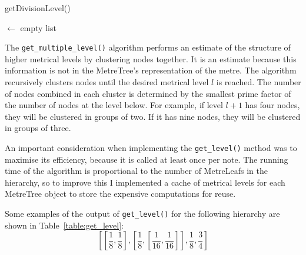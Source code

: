 \documentclass[12pt,twoside,openright]{report}
\begin{document}
\begin{algorithm}[H]

    \caption{getDivisionLevel()}
    \BlankLine

    \NewSequence $\gets$ empty list\;
    \label{alg:getDivisionLevel}
\end{algorithm}

The \verb'get_multiple_level()' algorithm performs an estimate of the structure of
higher metrical levels by clustering nodes together. It is an estimate because this information is not in the
MetreTree's representation of the metre. The algorithm recursively clusters nodes until
the desired metrical level $l$ is reached. The number of nodes combined in each cluster is
determined by the smallest prime factor of the number of nodes at the level below. For
example, if level $l+1$ has four nodes, they will be clustered in groups of two. If it
has nine nodes, they will be clustered in groups of three.

An important consideration when implementing the \verb'get_level()' method was to
maximise its efficiency, because it is called at least once per note. The
running time of the algorithm is proportional to the number of MetreLeafs in the
hierarchy, so to improve this I implemented a cache of metrical levels for each
MetreTree object to store the expensive computations for reuse.

Some examples of the output of \verb'get_level()' for the following hierarchy are shown in Table~\ref{table:get_level}:
\[
    \left[
        \left[\frac{1}{8},\frac{1}{8}\right],
        \left[
            \frac{1}{8},
            \left[\frac{1}{16},\frac{1}{16}\right]
        \right],
        \frac{1}{8},
        \frac{3}{4}
    \right]
\]
\end{document}
